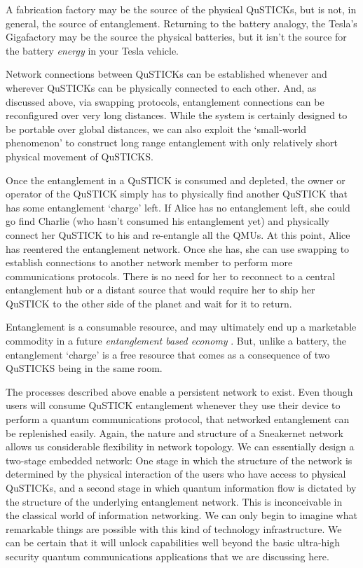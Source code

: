 \documentclass[twocolumn, aps, rmp, amsmath, amssymb, nofootinbib, superscriptaddress, longbibliography, floatfix, table-of-contents, eqsecnum]{revtex4-2}
\begin{document}
A fabrication factory may be the source of the physical QuSTICKs, but is not, in general, the source of entanglement. Returning to the battery analogy, the Tesla's Gigafactory may be the source the physical batteries, but it isn't the source for the battery \textit{energy} in your Tesla vehicle. 

Network connections between QuSTICKs can be established whenever and wherever QuSTICKs can be physically connected to each other. And, as discussed above, via swapping protocols, entanglement connections can be reconfigured over very long distances. While the system is certainly designed to be portable over global distances, we can also exploit the `small-world phenomenon' \cite{SD-Milgram1967} to construct long range entanglement with only relatively short physical movement of QuSTICKS. 

Once the entanglement in a QuSTICK is consumed and depleted, the owner or operator of the QuSTICK simply has to physically find another QuSTICK that has some entanglement `charge' left. If Alice has no entanglement left, she could go find Charlie (who hasn't consumed his entanglement yet) and physically connect her QuSTICK to his and re-entangle all the QMUs. At this point, Alice has reentered the entanglement network. Once she has, she can use swapping to establish connections to another network member to perform more communications protocols. There is no need for her to reconnect to a central entanglement hub or a distant source that would require her to ship her QuSTICK to the other side of the planet and wait for it to return. 

Entanglement is a consumable resource, and may ultimately end up a marketable commodity in a future {\em entanglement based economy} \cite{SD-Devitt:2016aa}. But, unlike a battery, the entanglement `charge' is a free resource that comes as a consequence of two QuSTICKS being in the same room.  

The processes described above enable a persistent network to exist. Even though users will consume QuSTICK entanglement whenever they use their device to perform a quantum communications protocol, that networked entanglement can be replenished easily. Again, the nature and structure of a Sneakernet network allows us considerable flexibility in network topology. We can essentially design a two-stage embedded network: One stage in which the structure of the network is determined by the physical interaction of the users who have access to physical QuSTICKs, and a second stage in which quantum information flow is dictated by the structure of the underlying entanglement network. This is inconceivable in the classical world of information networking. We can only begin to imagine what remarkable things are possible with this kind of technology infrastructure. We can be certain that it will unlock capabilities well beyond the basic ultra-high security quantum communications applications that we are discussing here. 
\end{document}

